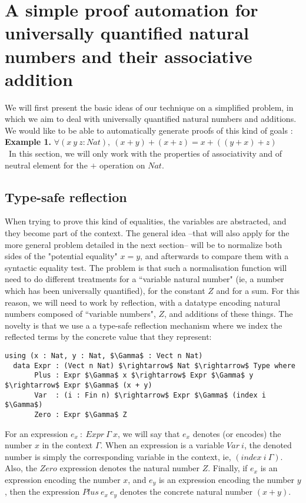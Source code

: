 \section{A simple proof automation for universally quantified natural numbers and their associative addition}
\label{sect:aSimpleProofAutomation}


We will first present the basic ideas of our technique on a simplified problem, in which we aim to deal with universally quantified natural numbers and additions. We would like to be able to automatically generate proofs of this kind of goals :
\\
\textbf{Example 1.} $\forall (x\ y\ z:Nat),\ (x + y) + (x + z) = x + ((y + x) + z)$  \\
\
In this section, we will only work with the properties of associativity and of neutral element for the $+$ operation on $Nat$.

\subsection{Type-safe reflection}


When trying to prove this kind of equalities, the variables are abstracted, and
they become part of the context. The general idea --that will also apply for
the more general problem detailed in the next section-- will be to normalize
both sides of the "potential equality" $x=y$, and afterwards to compare them
with a syntactic equality test. The problem is that such a normalisation
function will need to do different treatments for a ``variable natural number"
(ie, a number which has been universally quantified), for the constant $Z$ and
for a sum. For this reason, we will need to work by reflection, with a datatype
encoding natural numbers composed of ``variable numbers", $Z$, and additions of
these things. The novelty is that we use a a type-safe reflection mechanism
where we index the reflected terms by the concrete value that they represent: 

\begin{lstlisting}
using (x : Nat, y : Nat, $\Gamma$ : Vect n Nat)
  data Expr : (Vect n Nat) $\rightarrow$ Nat $\rightarrow$ Type where
       Plus : Expr $\Gamma$ x $\rightarrow$ Expr $\Gamma$ y $\rightarrow$ Expr $\Gamma$ (x + y)
       Var  : (i : Fin n) $\rightarrow$ Expr $\Gamma$ (index i $\Gamma$)
       Zero : Expr $\Gamma$ Z
\end{lstlisting}

For an expression $e_x\ :\ Expr\ \Gamma\ x$, we will say that $e_x$ denotes (or
encodes) the number $x$ in the context $\Gamma$.  When an expression is a
variable $Var\ i$, the denoted number is simply the corresponding variable in
the context, ie, $(index\ i\ \Gamma)$.  Also, the $Zero$ expression denotes the
natural number $Z$. Finally, if $e_x$ is an expression encoding the number $x$,
and $e_y$ is an expression encoding the number $y$, then the expression $Plus\
e_x\ e_y$ denotes the concrete natural number $(x + y)$.

